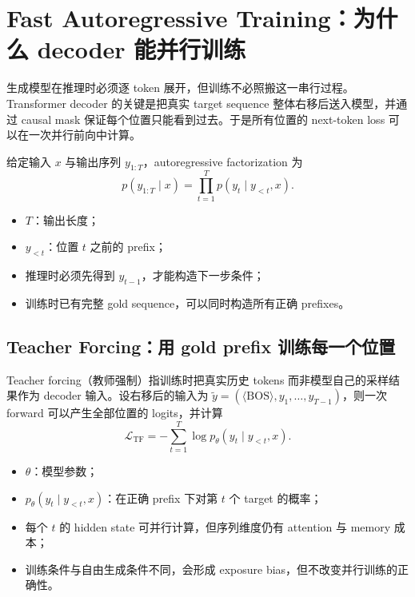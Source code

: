 \section{Fast Autoregressive Training：为什么 decoder 能并行训练}

生成模型在推理时必须逐 token 展开，但训练不必照搬这一串行过程。Transformer decoder 的关键是把真实 target sequence 整体右移后送入模型，并通过 causal mask 保证每个位置只能看到过去。于是所有位置的 next-token loss 可以在一次并行前向中计算。


给定输入 $x$ 与输出序列 $y_{1:T}$，autoregressive factorization 为
\[
p(y_{1:T}\mid x)=\prod_{t=1}^{T}p(y_t\mid y_{<t},x).
\]

\begin{itemize}
  \item $T$：输出长度；
  \item $y_{<t}$：位置 $t$ 之前的 prefix；
  \item 推理时必须先得到 $y_{t-1}$，才能构造下一步条件；
  \item 训练时已有完整 gold sequence，可以同时构造所有正确 prefixes。
\end{itemize}


\subsection{Teacher Forcing：用 gold prefix 训练每一个位置}

Teacher forcing（教师强制）指训练时把真实历史 tokens 而非模型自己的采样结果作为 decoder 输入。设右移后的输入为 $\tilde y=(\langle\mathrm{BOS}\rangle,y_1,\ldots,y_{T-1})$，则一次 forward 可以产生全部位置的 logits，并计算
\[
\mathcal{L}_{\mathrm{TF}}
=-\sum_{t=1}^{T}\log p_{\theta}(y_t\mid y_{<t},x).
\]

\begin{itemize}
  \item $\theta$：模型参数；
  \item $p_{\theta}(y_t\mid y_{<t},x)$：在正确 prefix 下对第 $t$ 个 target 的概率；
  \item 每个 $t$ 的 hidden state 可并行计算，但序列维度仍有 attention 与 memory 成本；
  \item 训练条件与自由生成条件不同，会形成 exposure bias，但不改变并行训练的正确性。
\end{itemize}

